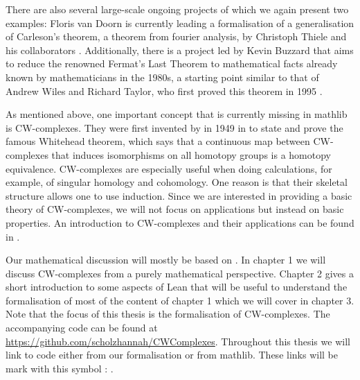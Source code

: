 There are also several large-scale ongoing projects of which we again present two examples: 
Floris van Doorn is currently leading a formalisation of a generalisation of Carleson's theorem, a theorem from fourier analysis, by Christoph Thiele and his collaborators \cite{Becker2024}.
Additionally, there is a project led by Kevin Buzzard that aims to reduce the renowned Fermat's Last Theorem to mathematical facts already known by mathematicians in the 1980s, a starting point similar to that of Andrew Wiles and Richard Taylor, who first proved this theorem in 1995 \cite{Buzzard2024}.

As mentioned above, one important concept that is currently missing in mathlib is CW-complexes. 
They were first invented by  in 1949 in \cite{Whitehead2018} to state and prove the famous Whitehead theorem, which says that a continuous map between CW-complexes that induces isomorphisms on all homotopy groups is a homotopy equivalence.
CW-complexes are especially useful when doing calculations, for example, of singular homology and cohomology. 
One reason is that their skeletal structure allows one to use induction.
Since we are interested in providing a basic theory of CW-complexes, we will not focus on applications but instead on basic properties. 
An introduction to CW-complexes and their applications can be found in \cite{Lundell1969}.

Our mathematical discussion will mostly be based on \cite{Hatcher2001}.
In chapter 1 we will discuss CW-complexes from a purely mathematical perspective. 
Chapter 2 gives a short introduction to some aspects of Lean that will be useful to understand the formalisation of most of the content of chapter 1 which we will cover in chapter 3. 
Note that the focus of this thesis is the formalisation of CW-complexes. 
The accompanying code can be found at \url{https://github.com/scholzhannah/CWComplexes}.
Throughout this thesis we will link to code either from our formalisation or from mathlib. 
These links will be mark with this symbol : \faExternalLink.